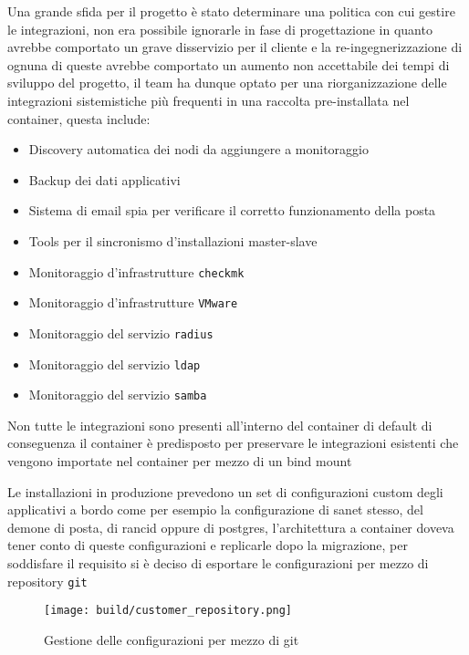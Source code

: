 Una grande sfida per il progetto è stato determinare una politica con cui gestire le integrazioni, non era possibile ignorarle in fase di progettazione in quanto avrebbe comportato un grave disservizio per il cliente e la re-ingegnerizzazione di ognuna di queste avrebbe comportato un aumento non accettabile dei tempi di sviluppo del progetto, il team ha dunque optato per una riorganizzazione delle integrazioni sistemistiche più frequenti in una raccolta pre-installata nel container, questa include:

\begin{itemize}
  \item{Discovery automatica dei nodi da aggiungere a monitoraggio}
  \item{Backup dei dati applicativi}
  \item{Sistema di email spia per verificare il corretto funzionamento della posta}
  \item{Tools per il sincronismo d'installazioni master-slave}
  \item{Monitoraggio d'infrastrutture \verb|checkmk|}
  \item{Monitoraggio d'infrastrutture \verb|VMware|}
  \item{Monitoraggio del servizio \verb|radius| }
  \item{Monitoraggio del servizio \verb|ldap| }
  \item{Monitoraggio del servizio \verb|samba| }
\end{itemize}

Non tutte le integrazioni sono presenti all'interno del container di default di conseguenza il container è predisposto per preservare le integrazioni esistenti che vengono importate nel container per mezzo di un bind mount

Le installazioni in produzione prevedono un set di configurazioni custom degli applicativi a bordo come per esempio la configurazione di sanet stesso, del demone di posta, di rancid oppure di postgres, l'architettura a container doveva tener conto di queste configurazioni e replicarle dopo la migrazione, per soddisfare il requisito si è deciso di esportare le configurazioni per mezzo di repository \verb|git|

\begin{figure}[H]
    \centering
    \texttt{[image: build/customer\_repository.png]}
    \caption{Gestione delle configurazioni per mezzo di git}
    \label{fig:customer_repository}
\end{figure}

